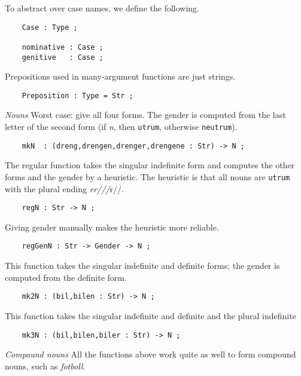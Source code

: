 \documentclass[11pt,a4paper]{article}
\newcommand{\subsubsubsection}[1]{\textit{#1}}
\begin{document}
To abstract over case names, we define the following.

\begin{verbatim}
    Case : Type ;
  
    nominative : Case ;
    genitive   : Case ;
\end{verbatim}

Prepositions used in many-argument functions are just strings.

\begin{verbatim}
    Preposition : Type = Str ;
\end{verbatim}

\subsubsubsection{Nouns}
Worst case: give all four forms. The gender is computed from the
last letter of the second form (if \textit{n}, then \texttt{utrum}, otherwise \texttt{neutrum}).

\begin{verbatim}
    mkN  : (dreng,drengen,drenger,drengene : Str) -> N ;
\end{verbatim}

The regular function takes the singular indefinite form
and computes the other forms and the gender by a heuristic.
The heuristic is that all nouns are \texttt{utrum} with the
plural ending \textit{er///}r//.

\begin{verbatim}
    regN : Str -> N ;
\end{verbatim}

Giving gender manually makes the heuristic more reliable.

\begin{verbatim}
    regGenN : Str -> Gender -> N ;
\end{verbatim}

This function takes the singular indefinite and definite forms; the
gender is computed from the definite form.

\begin{verbatim}
    mk2N : (bil,bilen : Str) -> N ;
\end{verbatim}

This function takes the singular indefinite and definite and the plural
indefinite

\begin{verbatim}
    mk3N : (bil,bilen,biler : Str) -> N ;
\end{verbatim}

\subsubsubsection{Compound nouns}
All the functions above work quite as well to form compound nouns,
such as \textit{fotboll}. 
\end{document}
